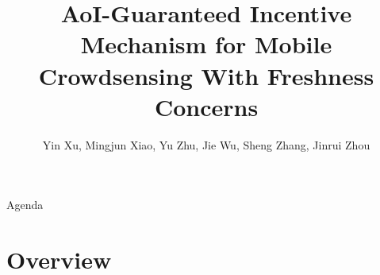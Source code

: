 \documentclass[aspectratio=169,xcolor=dvipsnames]{beamer}
\date{} %
\title{AoI-Guaranteed Incentive Mechanism for Mobile
Crowdsensing With Freshness Concerns}
\author{Yin Xu, Mingjun Xiao, Yu Zhu, Jie Wu,
Sheng Zhang, Jinrui Zhou }
\institute
{
    Published in: IEEE Transactions on Mobile Computing, 2024\\ \vspace{0.5cm}
    Presented by: Erez Weintraub\\
    Department of Electrical and Computer Engineering, Technion \\
}
\begin{document}
\begin{frame}
    \titlepage
\end{frame}

\begin{frame}{Agenda}
    \tableofcontents
\end{frame}

\section{Overview}
\end{document}
